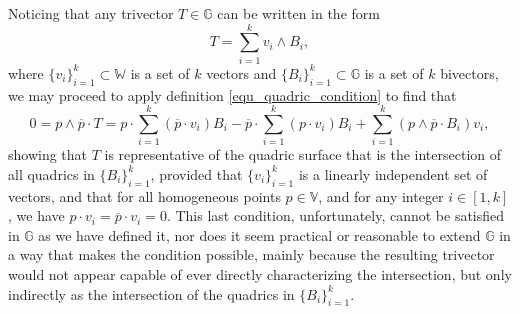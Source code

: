 \documentclass{birkjour}
\theoremstyle{definition}
\theoremstyle{remark}
\numberwithin{equation}{section}
\newcommand{\G}{\mathbb{G}}
\newcommand{\V}{\mathbb{V}}
\newcommand{\W}{\mathbb{W}}
\begin{document}
Noticing that any trivector $T\in\G$ can be written in the form
\begin{equation}
T = \sum_{i=1}^k v_i\wedge B_i,
\end{equation}
where $\{v_i\}_{i=1}^k\subset\W$ is a set of $k$ vectors and $\{B_i\}_{i=1}^k\subset\G$
is a set of $k$ bivectors, we may proceed to apply definition \eqref{equ_quadric_condition}
to find that
\begin{equation}\label{equ_trivector_geo}
0 = p\wedge\overline{p}\cdot T =
p\cdot\sum_{i=1}^k(\overline{p}\cdot v_i)B_i -
\overline{p}\cdot\sum_{i=1}^k(p\cdot v_i)B_i +
\sum_{i=1}^k(p\wedge\overline{p}\cdot B_i)v_i,
\end{equation}
showing that $T$ is representative of the quadric surface that is the intersection
of all quadrics in $\{B_i\}_{i=1}^k$, provided that $\{v_i\}_{i=1}^k$ is a linearly
independent set of vectors, and that for all homogeneous points $p\in\V$, and for any
integer $i\in[1,k]$, we have $p\cdot v_i=\overline{p}\cdot v_i=0$.  This last condition,
unfortunately, cannot be satisfied in $\G$ as we have defined it, nor does it seem
practical or reasonable to extend $\G$ in a way that makes the condition possible,
mainly because the resulting trivector would not appear capable of ever directly characterizing the
intersection, but only indirectly as the intersection of the quadrics in $\{B_i\}_{i=1}^k$.

\end{document}
